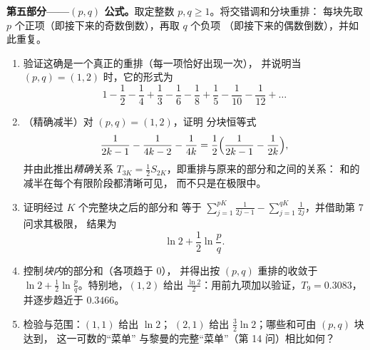 \begin{problem}[{周末问题——$H_n = \ln n + \gamma +
\frac{1}{2n} + O(n^{-2})$，并将 $1 - \frac12 +
\frac13 - \dots$ 重排为 $\frac{\ln 2}{2}$}]
\medskip
\noindent\textbf{第五部分——$(p, q)$ 公式。}取定整数
$p, q \geq 1$。将交错调和分块重排：
每块先取 $p$ 个正项（即接下来的奇数倒数），再取 $q$ 个负项
（即接下来的偶数倒数），并如此重复。
\begin{enumerate}[resume]
  \item 验证这确是一个真正的重排（每一项恰好出现一次），
        并说明当 $(p, q) = (1, 2)$ 时，它的形式为
        \[
        1 - \frac12 - \frac14 + \frac13 - \frac16 - \frac18 +
        \frac15 - \frac1{10} - \frac1{12} + \dots
        \]
  \item （精确减半）对 $(p, q) = (1, 2)$，证明
        分块恒等式
        \[
        \frac{1}{2k-1} - \frac{1}{4k-2} - \frac{1}{4k}
        = \frac12\Bigl(\frac{1}{2k-1} - \frac{1}{2k}\Bigr),
        \]
        并由此推出\emph{精确}关系 $T_{3K} = \frac12
        S_{2K}$，即重排与原来的部分和之间的关系：
        和的减半在每个有限阶段都清晰可见，
        而不只是在极限中。
  \item 证明经过 $K$ 个完整块之后的部分和
        等于 $\sum_{j=1}^{pK} \frac{1}{2j-1} -
        \sum_{j=1}^{qK} \frac{1}{2j}$，并借助第 7 问求其极限，
        结果为
        \[
        \ln 2 + \frac12 \ln\frac pq .
        \]
  \item 控制\emph{块内}的部分和（各项趋于 $0$），
        并得出按 $(p,
        q)$ 重排的收敛于 $\ln 2 + \frac12\ln
        \frac pq$。特别地，$(1, 2)$ 给出 $\frac{\ln
        2}{2}$：用前九项加以验证，$T_9 =
        0.3083$，并逐步趋近于 $0.3466$。
  \item 检验与范围：$(1,1)$ 给出 $\ln 2$；
        $(2,1)$ 给出 $\frac32\ln 2$；哪些和可由 $(p, q)$ 块达到，
        这一可数的“菜单”
        与黎曼的完整“菜单”（第 14 问）相比如何？
\end{enumerate}


\end{problem}
